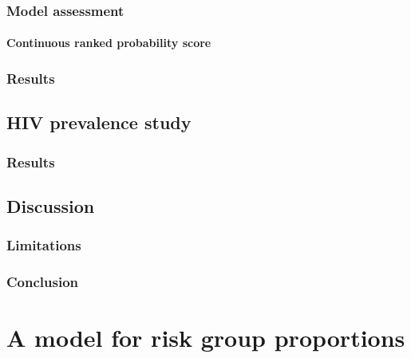 \documentclass[a4paper, nobind]{templates/ociamthesis}
\begin{document}
\hypertarget{model-assessment}{%
\subsection{Model assessment}\label{model-assessment}}

\hypertarget{continuous-ranked-probability-score}{%
\subsubsection{Continuous ranked probability score}\label{continuous-ranked-probability-score}}

\hypertarget{results}{%
\subsection{Results}\label{results}}

\hypertarget{hiv-prevalence-study}{%
\section{HIV prevalence study}\label{hiv-prevalence-study}}

\hypertarget{results-1}{%
\subsection{Results}\label{results-1}}

\hypertarget{discussion}{%
\section{Discussion}\label{discussion}}

\hypertarget{limitations}{%
\subsection{Limitations}\label{limitations}}

\hypertarget{conclusion}{%
\subsection{Conclusion}\label{conclusion}}

\hypertarget{multi-agyw}{%
\chapter{A model for risk group proportions}\label{multi-agyw}}

\adjustmtc
{}
\end{document}
